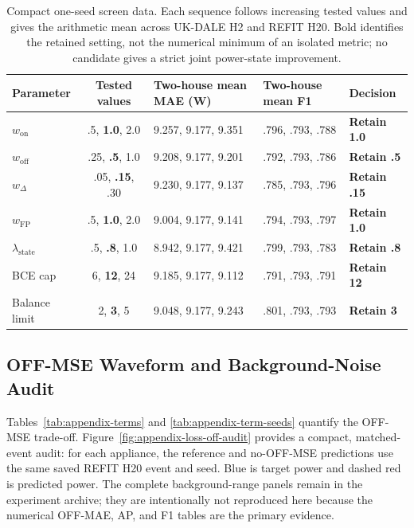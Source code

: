 \documentclass[conference]{IEEEtran}
\newcommand{\selected}[1]{\textbf{#1}}
\begin{document}
\begin{table}[!t]
\caption{Compact one-seed screen data. Each sequence follows increasing tested values and gives the arithmetic mean across UK-DALE H2 and REFIT H20. Bold identifies the retained setting, not the numerical minimum of an isolated metric; no candidate gives a strict joint power-state improvement.}
\label{tab:appendix-loss-screens}
\centering\scriptsize
\begin{tabular}{lclll}
\toprule
Parameter & Tested values & Two-house mean MAE (W) & Two-house mean F1 & Decision \\
\midrule
$w_{\mathrm{on}}$ & .5, \selected{1.0}, 2.0 & 9.257, 9.177, 9.351 & .796, .793, .788 & \selected{Retain 1.0} \\
$w_{\mathrm{off}}$ & .25, \selected{.5}, 1.0 & 9.208, 9.177, 9.201 & .792, .793, .786 & \selected{Retain .5} \\
$w_{\Delta}$ & .05, \selected{.15}, .30 & 9.230, 9.177, 9.137 & .785, .793, .796 & \selected{Retain .15} \\
$w_{\mathrm{FP}}$ & .5, \selected{1.0}, 2.0 & 9.004, 9.177, 9.141 & .794, .793, .797 & \selected{Retain 1.0} \\
$\lambda_{\mathrm{state}}$ & .5, \selected{.8}, 1.0 & 8.942, 9.177, 9.421 & .799, .793, .783 & \selected{Retain .8} \\
BCE cap & 6, \selected{12}, 24 & 9.185, 9.177, 9.112 & .791, .793, .791 & \selected{Retain 12} \\
Balance limit & 2, \selected{3}, 5 & 9.048, 9.177, 9.243 & .801, .793, .793 & \selected{Retain 3} \\
\bottomrule
\end{tabular}
\end{table}

\subsection{OFF-MSE Waveform and Background-Noise Audit}
\label{sec:appendix-loss-waveforms}

Tables~\ref{tab:appendix-terms} and \ref{tab:appendix-term-seeds} quantify the OFF-MSE trade-off.  Figure~\ref{fig:appendix-loss-off-audit} provides a compact, matched-event audit: for each appliance, the reference and no-OFF-MSE predictions use the same saved REFIT H20 event and seed.  Blue is target power and dashed red is predicted power.  The complete background-range panels remain in the experiment archive; they are intentionally not reproduced here because the numerical OFF-MAE, AP, and F1 tables are the primary evidence.
\end{document}
